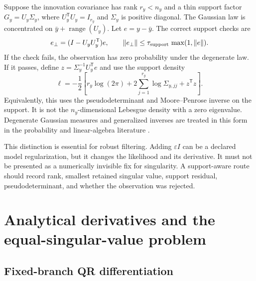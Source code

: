 \documentclass[11pt]{article}
\newcommand{\range}{\operatorname{range}}
\newcommand{\norm}[1]{\lVert #1\rVert}
\newcommand{\transpose}{^{\mathsf T}}
\begin{document}
Suppose the innovation covariance has rank $r_y<n_y$ and a thin support factor
$G_y=U_y\Sigma_y$, where $U_y\transpose U_y=I_{r_y}$ and $\Sigma_y$ is positive
diagonal.  The Gaussian law is concentrated on
$\bar y+\range(U_y)$.  Let $e=y-\bar y$.  The correct support checks are
\begin{equation}
 e_\perp=(I-U_yU_y\transpose)e,
 \qquad \norm{e_\perp}\leq\tau_{\rm support}\,\max(1,\norm e).
 \label{eq:support-check}
\end{equation}
If the check fails, the observation has zero probability under the degenerate
law.  If it passes, define $z=\Sigma_y^{-1}U_y\transpose e$ and use the
support density
\begin{equation}
 \ell=-\frac12\left[r_y\log(2\pi)+2\sum_{j=1}^{r_y}\log\Sigma_{y,jj}
 +z\transpose z\right].
 \label{eq:singular-likelihood}
\end{equation}
Equivalently, this uses the pseudodeterminant and Moore--Penrose inverse on the
support.  It is not the $n_y$-dimensional Lebesgue density with a zero
eigenvalue.  Degenerate Gaussian measures and generalized inverses are treated
in this form in the probability and linear-algebra literature
\cite{bogachev1998,benisraelgreville2003}.

This distinction is essential for robust filtering.  Adding $\varepsilon I$ can
be a declared model regularization, but it changes the likelihood and its
derivative.  It must not be presented as a numerically invisible fix for
singularity.  A support-aware route should record rank, smallest retained
singular value, support residual, pseudodeterminant, and whether the observation
was rejected.

\section{Analytical derivatives and the equal-singular-value problem}

\subsection{Fixed-branch QR differentiation}
\label{sec:qr-derivative}
\end{document}
